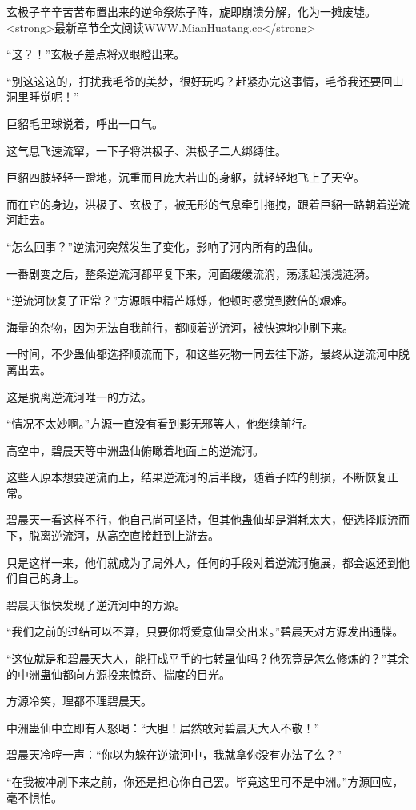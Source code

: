 \begin{this_body}
玄极子辛辛苦苦布置出来的逆命祭炼子阵，旋即崩溃分解，化为一摊废墟。<strong>最新章节全文阅读WWW.MianHuatang.cc</strong>

“这？！”玄极子差点将双眼瞪出来。

“别这这这的，打扰我毛爷的美梦，很好玩吗？赶紧办完这事情，毛爷我还要回山洞里睡觉呢！”

巨貂毛里球说着，呼出一口气。

这气息飞速流窜，一下子将洪极子、洪极子二人绑缚住。

巨貂四肢轻轻一蹬地，沉重而且庞大若山的身躯，就轻轻地飞上了天空。

而在它的身边，洪极子、玄极子，被无形的气息牵引拖拽，跟着巨貂一路朝着逆流河赶去。

“怎么回事？”逆流河突然发生了变化，影响了河内所有的蛊仙。

一番剧变之后，整条逆流河都平复下来，河面缓缓流淌，荡漾起浅浅涟漪。

“逆流河恢复了正常？”方源眼中精芒烁烁，他顿时感觉到数倍的艰难。

海量的杂物，因为无法自我前行，都顺着逆流河，被快速地冲刷下来。

一时间，不少蛊仙都选择顺流而下，和这些死物一同去往下游，最终从逆流河中脱离出去。

这是脱离逆流河唯一的方法。

“情况不太妙啊。”方源一直没有看到影无邪等人，他继续前行。

高空中，碧晨天等中洲蛊仙俯瞰着地面上的逆流河。

这些人原本想要逆流而上，结果逆流河的后半段，随着子阵的削损，不断恢复正常。

碧晨天一看这样不行，他自己尚可坚持，但其他蛊仙却是消耗太大，便选择顺流而下，脱离逆流河，从高空直接赶到上游去。

只是这样一来，他们就成为了局外人，任何的手段对着逆流河施展，都会返还到他们自己的身上。

碧晨天很快发现了逆流河中的方源。

“我们之前的过结可以不算，只要你将爱意仙蛊交出来。”碧晨天对方源发出通牒。

“这位就是和碧晨天大人，能打成平手的七转蛊仙吗？他究竟是怎么修炼的？”其余的中洲蛊仙都向方源投来惊奇、揣度的目光。

方源冷笑，理都不理碧晨天。

中洲蛊仙中立即有人怒喝：“大胆！居然敢对碧晨天大人不敬！”

碧晨天冷哼一声：“你以为躲在逆流河中，我就拿你没有办法了么？”

“在我被冲刷下来之前，你还是担心你自己罢。毕竟这里可不是中洲。”方源回应，毫不惧怕。


\end{this_body}
